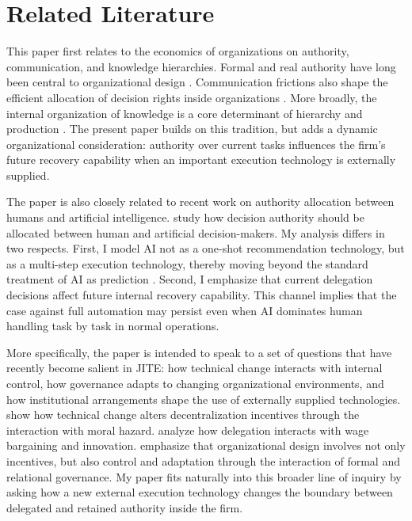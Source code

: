 \section{Related Literature}
\label{sec:lit}

This paper first relates to the economics of organizations on authority, communication, and knowledge hierarchies. Formal and real authority have long been central to organizational design \citep{AghionTirole1997}. Communication frictions also shape the efficient allocation of decision rights inside organizations \citep{Dessein2002}. More broadly, the internal organization of knowledge is a core determinant of hierarchy and production \citep{Garicano2000}. The present paper builds on this tradition, but adds a dynamic organizational consideration: authority over current tasks influences the firm's future recovery capability when an important execution technology is externally supplied.

The paper is also closely related to recent work on authority allocation between humans and artificial intelligence. \citet{AtheyBryanGans2020} study how decision authority should be allocated between human and artificial decision-makers. My analysis differs in two respects. First, I model AI not as a one-shot recommendation technology, but as a multi-step execution technology, thereby moving beyond the standard treatment of AI as prediction \citep{AgrawalGansGoldfarb2019}. Second, I emphasize that current delegation decisions affect future internal recovery capability. This channel implies that the case against full automation may persist even when AI dominates human handling task by task in normal operations.

More specifically, the paper is intended to speak to a set of questions that have recently become salient in JITE: how technical change interacts with internal control, how governance adapts to changing organizational environments, and how institutional arrangements shape the use of externally supplied technologies. \citet{MarschakWei2024} show how technical change alters decentralization incentives through the interaction with moral hazard. \citet{MukherjeeSaha2024} analyze how delegation interacts with wage bargaining and innovation. \citet{BakerGibbonsMurphy2023} emphasize that organizational design involves not only incentives, but also control and adaptation through the interaction of formal and relational governance. My paper fits naturally into this broader line of inquiry by asking how a new external execution technology changes the boundary between delegated and retained authority inside the firm.

